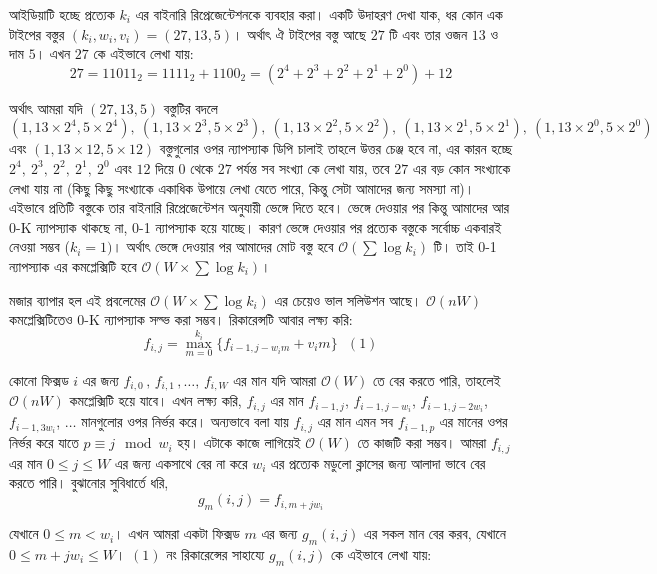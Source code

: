 আইডিয়াটি হচ্ছে প্রত্যেক \(k_{i}\) এর বাইনারি রিপ্রেজেন্টেশনকে ব্যবহার করা। একটি উদাহরণ দেখা যাক, ধর কোন এক টাইপের বস্তুর \((k_{i}, w_{i}, v_{i}) = (27, 13, 5)\)।  অর্থাৎ ঐ টাইপের বস্তু আছে \(27\) টি এবং তার ওজন \(13\) ও দাম \(5\)। এখন \(27\) কে এইভাবে লেখা যায়: \[27 = 11011_{2} = 1111_{2} + 1100_{2} = (2^{4} + 2^{3} + 2^{2} + 2^{1} + 2^{0}) + 12\]

অর্থাৎ আমরা যদি \((27, 13, 5)\) বস্তুটির বদলে \((1, 13 \times 2^{4}, 5 \times 2^{4}), \ (1, 13 \times 2^{3}, 5 \times 2^{3}), \ (1, 13 \times 2^{2}, 5 \times 2^{2}), \ (1, 13 \times 2^{1}, 5 \times 2^{1}), \ (1, 13 \times 2^{0}, 5 \times 2^{0})\) এবং \((1, 13 \times 12, 5 \times 12)\) বস্তুগুলোর ওপর ন্যাপস্যাক ডিপি চালাই তাহলে উত্তর চেঞ্জ হবে না, এর কারন হচ্ছে \(2^{4}, \ 2^{3}, \ 2^{2}, \ 2^{1}, \ 2^{0}\) এবং \(12\) দিয়ে  \(0\) থেকে \(27\) পর্যন্ত সব সংখ্যা কে লেখা যায়, তবে $27$ এর বড় কোন সংখ্যাকে লেখা যায় না (কিছু কিছু সংখ্যাকে একাধিক উপায়ে লেখা যেতে পারে, কিন্তু সেটা আমাদের জন্য সমস্যা না)। এইভাবে প্রতিটি বস্তুকে তার বাইনারি রিপ্রেজেন্টেশন অনুযায়ী ভেঙ্গে দিতে হবে। ভেঙ্গে দেওয়ার পর কিন্তু আমাদের আর 0-K ন্যাপস্যাক থাকছে না, 0-1 ন্যাপস্যাক হয়ে যাচ্ছে। কারণ ভেঙ্গে দেওয়ার পর প্রত্যেক বস্তুকে সর্বোচ্চ একবারই নেওয়া সম্ভব (\(k_{i} = 1)\)।  অর্থাৎ ভেঙ্গে দেওয়ার পর আমাদের মোট বস্তু হবে \(\mathcal{O}(\sum \log k_{i})\) টি। তাই 0-1 ন্যাপস্যাক এর কমপ্লেক্সিটি হবে \(\mathcal{O}(W \times \sum \log k_{i})\)। 

মজার ব্যাপার হল এই প্রবলেমের \(\mathcal{O}(W \times \sum \log k_{i})\) এর চেয়েও ভাল সলিউশন আছে। \(\mathcal{O}(nW)\) কমপ্লেক্সিটিতেও 0-K ন্যাপস্যাক সল্ভ করা সম্ভব। রিকারেন্সটি আবার লক্ষ্য করি:
\[f_{i, j} = \max_{m = 0}^{k_{i}} \lbrace f_{i - 1, j - w_{i}m} + v_{i}m \rbrace \ \ \ (1)\]

কোনো ফিক্সড \(i\) এর জন্য \(f_{i, 0} \, , \, f_{i, 1} \, , \dots, \, f_{i, W}\) এর মান যদি আমরা \(\mathcal{O}(W)\) তে বের করতে পারি, তাহলেই \(\mathcal{O}(nW)\) কমপ্লেক্সিটি হয়ে যাবে। এখন লক্ষ্য করি, \(f_{i, j}\) এর মান $f_{i - 1, j}$, $f_{i - 1, j - w_{i}}$, $f_{i - 1, j - 2w_{i}}$, $f_{i - 1, 3w_{i}}$, $\dots$ মানগুলোর ওপর নির্ভর করে। অন্যভাবে বলা যায় \(f_{i, j}\) এর মান এমন সব \(f_{i - 1, p}\) এর মানের ওপর নির্ভর করে যাতে \(p \equiv j \mod w_{i}\) হয়।  এটাকে কাজে লাগিয়েই \(\mathcal{O}(W)\) তে কাজটি করা সম্ভব। আমরা \(f_{i, j}\) এর মান \(0 \leq j \leq W\) এর জন্য একসাথে বের না করে \(w_{i}\) এর প্রত্যেক মডুলো ক্লাসের জন্য আলাদা ভাবে বের করতে পারি।  বুঝানোর  সুবিধার্তে ধরি, 
\[g_{m}(i, j) = f_{i, m + jw_{i}}\]
 
যেখানে \(0 \leq m < w_{i}\)। এখন আমরা একটা ফিক্সড \(m\) এর জন্য \(g_{m}(i, j)\) এর সকল মান বের করব, যেখানে \(0 \leq m + jw_{i} \leq W\)।  \((1)\) নং রিকারেন্সের সাহায্যে \(g_{m}(i, j)\) কে এইভাবে লেখা যায়: 


